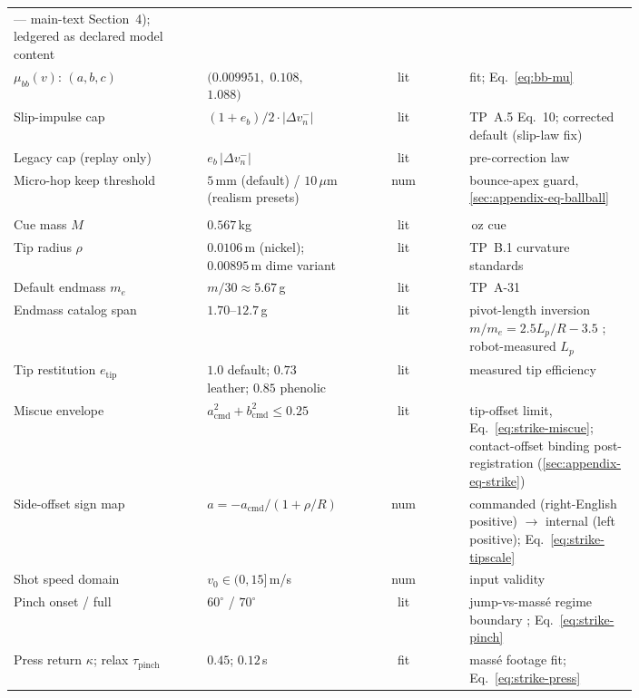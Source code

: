 {\begin{longtable}{@{}>{\raggedright\arraybackslash}p{0.31\linewidth}>{\raggedright\arraybackslash}p{0.22\linewidth}c>{\raggedright\arraybackslash}p{0.27\linewidth}@{}}
    --- main-text Section~4); ledgered as declared model content \\
  $\mu_{bb}(v)$: $(a, b, c)$ & $(0.009951,$ $0.108,$ $1.088)$ & lit &
    \citet{alciatore_tp_a14} fit; Eq.~\eqref{eq:bb-mu} \\
  Slip-impulse cap & $(1+e_b)/2 \cdot |\Delta v_n^{-}|$ & lit &
    TP~A.5 Eq.~10; corrected default (slip-law fix) \\
  Legacy cap (replay only) & $e_b\,|\Delta v_n^{-}|$ & lit &
    pre-correction law \citep{kiefl2024pooltool} \\
  Micro-hop keep threshold & $5$\,mm (default) / $10\,\mu$m
    (realism presets) & num & bounce-apex guard,
    \ref{sec:appendix-eq-ballball} \\
  \addlinespace
  \multicolumn{4}{@{}l}{\emph{Stick--ball strike
    (\ref{sec:appendix-eq-strike})}}\\
  Cue mass $M$ & $0.567$\,kg & lit & 20\,oz cue \\
  Tip radius $\rho$ & $0.0106$\,m (nickel); $0.00895$\,m dime variant
    & lit & TP~B.1 curvature standards \\
  Default endmass $m_e$ & $m/30 \approx 5.67$\,g & lit & TP~A-31
    \citep{alciatore_tp_a31} \\
  Endmass catalog span & $1.70$--$12.7$\,g & lit & pivot-length
    inversion $m/m_e = 2.5 L_p/R - 3.5$
    \citep{shepard2001squirt}; robot-measured $L_p$ \\
  Tip restitution $e_{\mathrm{tip}}$ & $1.0$ default; $0.73$ leather;
    $0.85$ phenolic & lit & measured tip efficiency
    \citep{alciatore_hsv_catalog} \\
  Miscue envelope & $a_{\mathrm{cmd}}^2 + b_{\mathrm{cmd}}^2 \le 0.25$
    & lit & tip-offset limit, Eq.~\eqref{eq:strike-miscue};
    contact-offset binding post-registration
    (\ref{sec:appendix-eq-strike}) \\
  Side-offset sign map & $a = -a_{\mathrm{cmd}}/(1+\rho/R)$ & num &
    commanded (right-English positive) $\to$ internal (left positive);
    Eq.~\eqref{eq:strike-tipscale} \\
  Shot speed domain & $v_0 \in (0, 15]$\,m/s & num & input validity \\
  Pinch onset / full & $60^{\circ}$ / $70^{\circ}$ & lit &
    jump-vs-mass\'e regime boundary \citep{coriolis1835};
    Eq.~\eqref{eq:strike-pinch} \\
  Press return $\kappa$; relax $\tau_{\mathrm{pinch}}$ & $0.45$;
    $0.12$\,s & fit & mass\'e footage fit;
    Eq.~\eqref{eq:strike-press} \\

\end{longtable}}
